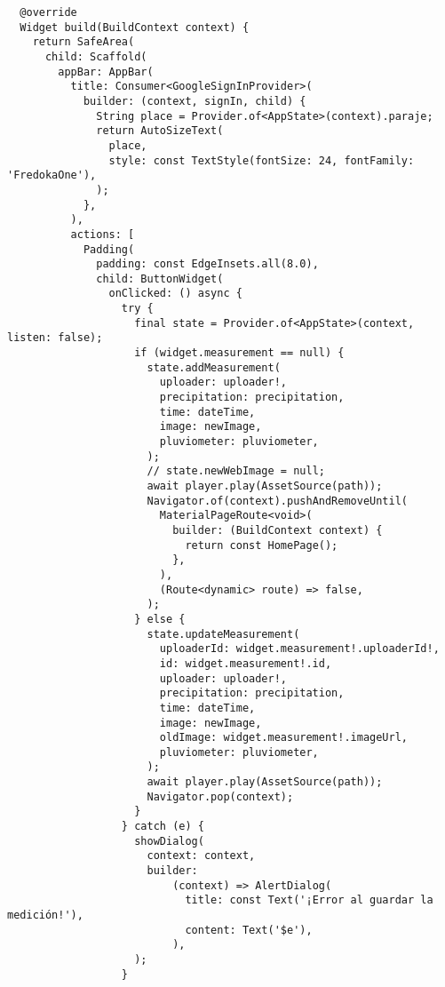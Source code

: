 \begin{verbatim}
  @override
  Widget build(BuildContext context) {  
    return SafeArea(
      child: Scaffold(
        appBar: AppBar(
          title: Consumer<GoogleSignInProvider>(
            builder: (context, signIn, child) {
              String place = Provider.of<AppState>(context).paraje;
              return AutoSizeText(
                place,
                style: const TextStyle(fontSize: 24, fontFamily: 'FredokaOne'),
              );
            },
          ),
          actions: [
            Padding(
              padding: const EdgeInsets.all(8.0),
              child: ButtonWidget(
                onClicked: () async {
                  try {
                    final state = Provider.of<AppState>(context, listen: false);
                    if (widget.measurement == null) {
                      state.addMeasurement(
                        uploader: uploader!,
                        precipitation: precipitation,
                        time: dateTime,
                        image: newImage,
                        pluviometer: pluviometer,
                      );
                      // state.newWebImage = null;
                      await player.play(AssetSource(path));
                      Navigator.of(context).pushAndRemoveUntil(
                        MaterialPageRoute<void>(
                          builder: (BuildContext context) {
                            return const HomePage();
                          },
                        ),
                        (Route<dynamic> route) => false,
                      );
                    } else {
                      state.updateMeasurement(
                        uploaderId: widget.measurement!.uploaderId!,
                        id: widget.measurement!.id,
                        uploader: uploader!,
                        precipitation: precipitation,
                        time: dateTime,
                        image: newImage,
                        oldImage: widget.measurement!.imageUrl,
                        pluviometer: pluviometer,
                      );
                      await player.play(AssetSource(path));
                      Navigator.pop(context);
                    }
                  } catch (e) {
                    showDialog(
                      context: context,
                      builder:
                          (context) => AlertDialog(
                            title: const Text('¡Error al guardar la medición!'),
                            content: Text('$e'),
                          ),
                    );
                  }

\end{verbatim}
